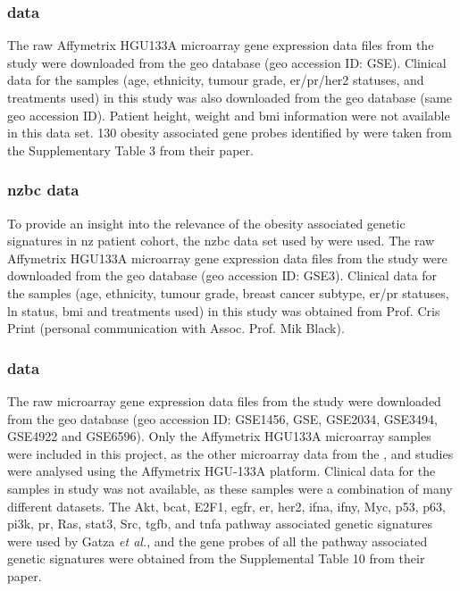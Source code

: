 \subsubsection{\citet{Fuentes-Mattei2014} data}
\label{ssub:fuentes-mattei2014_data}

The raw Affymetrix HGU\-133A microarray gene expression data files from the  \citet{Fuentes-Mattei2014} study were downloaded from the \gls{geo} database (\gls{geo} accession ID: GSE).
Clinical data for the samples (age, ethnicity, tumour grade, \gls{er}/\gls{pr}/\gls{her2} statuses, and treatments used) in this study was also downloaded from the \gls{geo} database (same \gls{geo} accession ID).
Patient height, weight and \gls{bmi} information were not available in this data set.
130 obesity associated gene probes identified by \citet{Fuentes-Mattei2014} were taken from the Supplementary Table 3 from their paper.

\subsubsection{\gls{nzbc} data}
\label{ssub:nzbc_data}

To provide an insight into the relevance of the obesity associated genetic signatures in \gls{nz} patient cohort, the \gls{nzbc} data set used by \citet{Print2016} were used.
The raw Affymetrix HGU133A microarray gene expression data files from the \citet{Print2016} study were downloaded from the \gls{geo} database (\gls{geo} accession ID: GSE3).
Clinical data for the samples (age, ethnicity, tumour grade, breast cancer subtype, \gls{er}/\gls{pr} statuses, \gls{ln} status, \gls{bmi} and treatments used) in this study was obtained from Prof. Cris Print (personal communication with Assoc. Prof. Mik Black).

\subsubsection{\citet{Gatza2010a} data}
\label{ssub:gatza2010a_data}

The raw microarray gene expression data files from the \citet{Gatza2010a} study were downloaded from the \gls{geo} database (\gls{geo} accession ID: GSE1456, GSE, GSE2034, GSE3494, GSE4922 and GSE6596).
Only the Affymetrix HGU\-133A microarray samples were included in this project, as the other microarray data from the \citet{Creighton2012}, \citet{Fuentes-Mattei2014} and \citet{Print2016} studies were analysed using the Affymetrix HGU-133A platform.
Clinical data for the samples in \citet{Gatza2010a} study was not available, as these samples were a combination of many different datasets.
The Akt, \gls{bcat}, E2F1, \gls{egfr}, \gls{er}, \gls{her2}, \gls{ifna}, \gls{ifny}, Myc, p53, p63, \gls{pi3k}, \gls{pr}, Ras, \gls{stat3}, Src, \gls{tgfb}, and \gls{tnfa} pathway associated genetic signatures were used by Gatza \textit{et al.}, and the gene probes of all the pathway associated genetic signatures were obtained from the Supplemental Table 10 from their paper.

